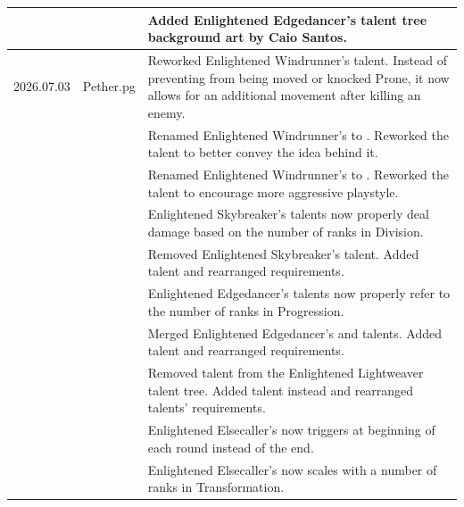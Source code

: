 \begin{tabular}{p{1.7cm} p{1.7cm} p{13cm}}
	&& \color{black} Added Enlightened Edgedancer's talent tree background art by Caio Santos. \\
	
	\hline
	\color{black} 2026.07.03
	& \color{black} Pether.pg
	
	& \color{black} Reworked Enlightened Windrunner's \talentWindrunnerKeyName{} talent. Instead of preventing from being moved or knocked Prone, it now allows for an additional movement after killing an enemy. \\
	
	&& \color{black} Renamed Enlightened Windrunner's \talentWindrunnerEnhanceName{} to \talentWindrunnerSeeRedName{}. Reworked the talent to better convey the idea behind it. \\
	
	&& \color{black} Renamed Enlightened Windrunner's \talentWindrunnerStrikeName{} to \talentWindrunnerRecklessName{}. Reworked the talent to encourage more aggressive playstyle. \\
	
	&& \color{black} Enlightened Skybreaker's talents now properly deal damage based on the number of ranks in Division. \\	
	
	&& \color{black} Removed Enlightened Skybreaker's \talentSkybreakerStormName{} talent. Added \talentSkybreakerRetributionName{} talent and rearranged requirements. \\
	
	&& \color{black} Enlightened Edgedancer's talents now properly refer to the number of ranks in Progression. \\
	
	&& \color{black} Merged Enlightened Edgedancer's \talentEdgedancerRemainsName{} and \talentEdgedancerReanimateName{} talents. Added \talentEdgedancerSpeakWithDeadName{} talent and rearranged requirements. \\
	
	&& \color{black} Removed \talentLightweaverDetermineOthersName{} talent from the Enlightened Lightweaver talent tree. Added \talentLightweaverSecretsLureName{} talent instead and rearranged talents' requirements. \\
	
	&& \color{black} Enlightened Elsecaller's \talentElsecallerKeyName{} now triggers at beginning of each round instead of the end.\\
	
	&& \color{black} Enlightened Elsecaller's \talentElsecallerDirgeName{} now scales with a number of ranks in Transformation. \\
	

\end{tabular}

